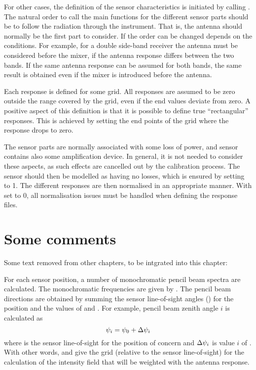 For other cases, the definition of the sensor characteristics is initiated by
calling . The natural order to call the main
functions for the different sensor parts should be to follow the radiation
through the instrument. That is, the antenna should normally be the first part
to consider. If the order can be changed depends on the conditions. For
example, for a double side-band receiver the antenna must be considered before
the mixer, if the antenna response differs between the two bands. If the same
antenna response can be assumed for both bands, the same result is obtained
even if the mixer is introduced before the antenna.

Each response is defined for some grid. All responses are assumed to be zero
outside the range covered by the grid, even if the end values deviate from
zero. A positive aspect of this definition is that it is possible to define true
``rectangular'' responses. This is achieved by setting the end points of the
grid where the response drops to zero.

The sensor parts are normally associated with some loss of power, and sensor
contains also some amplification device. In general, it is not needed to
consider these aspects, as such effects are cancelled out by the calibration
process. The sensor should then be modelled as having no losses, which is
ensured by setting  to 1. The different responses are
then normalised in an appropriate manner. With  set to
0, all normalisation issues must be handled when defining the response files.


\section{Some comments}

Some text removed from other chapters, to be intgrated into this chapter:

For each sensor position, a number of monochromatic pencil beam
spectra are calculated. The monochromatic frequencies are given by
. The pencil
beam directions are obtained by summing the sensor line-of-sight
angles () for the position and the values of
 and . For
example, pencil beam zenith angle $i$ is calculated as
\begin{equation}
  \psi_{i} = \psi_{0} + \Delta\psi_{i}
  \label{eq:fm_defs:psi_grid}
\end{equation}
where  is the sensor line-of-sight for the position of
concern and $\Delta\psi_{i}$ is value $i$ of
.  With other words,
 and  give
the grid (relative to the sensor line-of-sight) for the calculation of
the intensity field that will be weighted with the antenna response.


